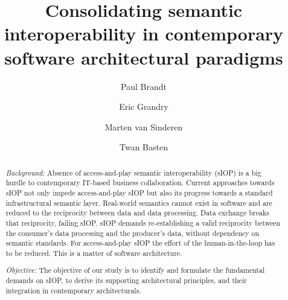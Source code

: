 \documentclass[sort&compress,preprint,authoryear,3p,twocolumn]{elsarticle}
\begin{document}
\begin{frontmatter}

  \title{Consolidating semantic interoperability in contemporary
software architectural paradigms}

  \author[1]{Paul
Brandt}   \author[2]{Eric
Grandry}   \author[4]{Marten
van
Sinderen}   \author[1,3]{Twan
Basten}%

    

\begin{abstract}
\emph{Background:} Absence of access-and-play semantic interoperability
(sIOP) is a big hurdle to contemporary IT-based business collaboration.
Current approaches towards sIOP not only impede access-and-play sIOP but
also its progress towards a standard infrastructural semantic layer.
Real-world semantics cannot exist in software and are reduced to the
reciprocity between data and data processing. Data exchange breaks that
reciprocity, failing sIOP. sIOP demands re-establishing a valid
reciprocity between the consumer's data processing and the producer's
data, without dependency on semantic standards. For access-and-play sIOP
the effort of the human-in-the-loop has to be reduced. This is a matter
of software architecture.

\emph{Objective:} The objective of our study is to identify and
formulate the fundamental demands on sIOP, to derive its supporting
architectural principles, and their integration in contemporary
architecturals.


\end{abstract}
\end{frontmatter}
\end{document}
